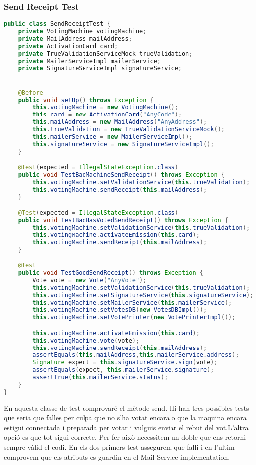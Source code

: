 \documentclass[11pt]{article}
\begin{document}
	\subsubsection{Send Receipt Test}
	\begin{lstlisting}[basicstyle=\ttfamily\scriptsize,language=Java]
public class SendReceiptTest {
    private VotingMachine votingMachine;
    private MailAddress mailAddress;
    private ActivationCard card;
    private TrueValidationServiceMock trueValidation;
    private MailerServiceImpl mailerService;
    private SignatureServiceImpl signatureService;


    @Before
    public void setUp() throws Exception {
        this.votingMachine = new VotingMachine();
        this.card = new ActivationCard("AnyCode");
        this.mailAddress = new MailAddress("AnyAddress");
        this.trueValidation = new TrueValidationServiceMock();
        this.mailerService = new MailerServiceImpl();
        this.signatureService = new SignatureServiceImpl();
    }

    @Test(expected = IllegalStateException.class)
    public void TestBadMachineSendReceipt() throws Exception {
        this.votingMachine.setValidationService(this.trueValidation);
        this.votingMachine.sendReceipt(this.mailAddress);
    }

    @Test(expected = IllegalStateException.class)
    public void TestBadHasVotedSendReceipt() throws Exception {
        this.votingMachine.setValidationService(this.trueValidation);
        this.votingMachine.activateEmission(this.card);
        this.votingMachine.sendReceipt(this.mailAddress);
    }

    @Test
    public void TestGoodSendReceipt() throws Exception {
        Vote vote = new Vote("AnyVote");
        this.votingMachine.setValidationService(this.trueValidation);
        this.votingMachine.setSignatureService(this.signatureService);
        this.votingMachine.setMailerService(this.mailerService);
        this.votingMachine.setVotesDB(new VotesDBImpl());
        this.votingMachine.setVotePrinter(new VotePrinterImpl());

        this.votingMachine.activateEmission(this.card);
        this.votingMachine.vote(vote);
        this.votingMachine.sendReceipt(this.mailAddress);
        assertEquals(this.mailAddress,this.mailerService.address);
        Signature expect = this.signatureService.sign(vote);
        assertEquals(expect, this.mailerService.signature);
        assertTrue(this.mailerService.status);
    }
}
	\end{lstlisting}
	En aquesta classe de test comprovaré el mètode send. Hi han tres possibles tests que seria que falles per culpa que no s'ha votat encara o que la maquina encara estigui connectada i preparada per votar i vulguis enviar el rebut del vot.L'altra opció es que tot sigui correcte. Per fer això necessitem un doble que ens retorni sempre vàlid el codi. En els dos primers test assegurem que falli i en l'ultim comprovem que els atributs es guardin en el Mail Service implementation.
	\\\\
\end{document}
